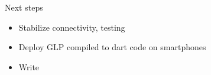 \begin{frame}{Next steps}
    \begin{itemize}
        \item Stabilize connectivity, testing
        \item Deploy GLP compiled to dart code on smartphones
        \item Write
    \end{itemize}
\end{frame}